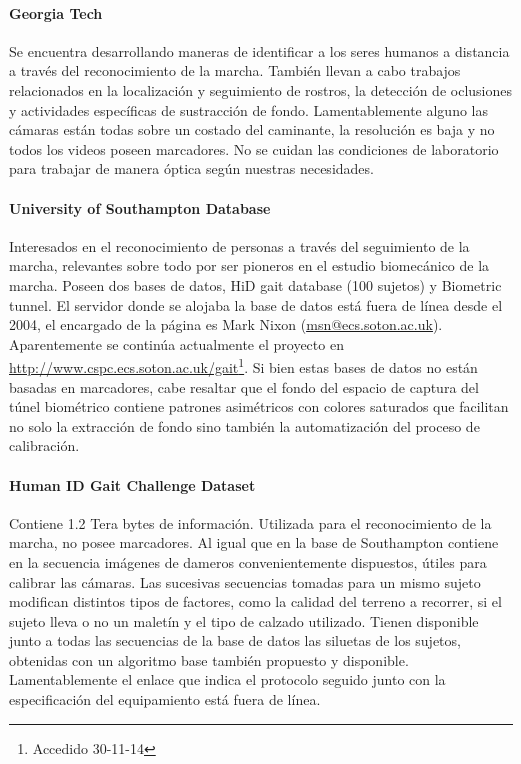 \paragraph{Georgia Tech}
Se encuentra desarrollando maneras de identificar a los seres humanos a distancia a través del reconocimiento de la marcha. También llevan a cabo trabajos relacionados en la localización y seguimiento de rostros, la detección de oclusiones y actividades específicas de sustracción de fondo.
Lamentablemente alguno las cámaras están todas sobre un costado del caminante, la resolución es baja y no todos los videos poseen marcadores. No se cuidan las condiciones de laboratorio para trabajar de manera óptica según nuestras necesidades.


\paragraph{University of Southampton Database}
Interesados en el reconocimiento de personas a través del seguimiento de la marcha, relevantes sobre todo por ser pioneros en el estudio biomecánico de la marcha. Poseen dos bases de datos, HiD gait database  (100 sujetos) y Biometric tunnel. El servidor donde se alojaba la base de datos está fuera de línea desde el 2004, el encargado de la página es Mark Nixon (\textcolor{blue}{\underline{\url{msn@ecs.soton.ac.uk}}}). Aparentemente se continúa actualmente el proyecto en \textcolor{blue}{\underline{\url{http://www.cspc.ecs.soton.ac.uk/gait}}}\footnote{Accedido 30-11-14}. Si bien estas bases de datos no están basadas en marcadores, cabe resaltar que el fondo del espacio de captura del túnel biométrico contiene patrones asimétricos con colores saturados que facilitan no solo la extracción de fondo sino también la automatización del proceso de calibración.

\paragraph{Human ID Gait Challenge Dataset}
Contiene 1.2 Tera bytes de información. Utilizada para el reconocimiento de la marcha,  no posee marcadores. Al igual que en la base de Southampton contiene en la secuencia imágenes de dameros convenientemente dispuestos, útiles para calibrar las cámaras. Las sucesivas secuencias tomadas para un mismo sujeto modifican distintos tipos de factores, como la calidad del terreno a recorrer, si el sujeto lleva o no un maletín y el  tipo de calzado utilizado. Tienen disponible junto a todas las secuencias de la base de datos las siluetas de los sujetos, obtenidas con un algoritmo base también propuesto y disponible. Lamentablemente el enlace que indica el protocolo seguido junto con la especificación del equipamiento está fuera de línea.

